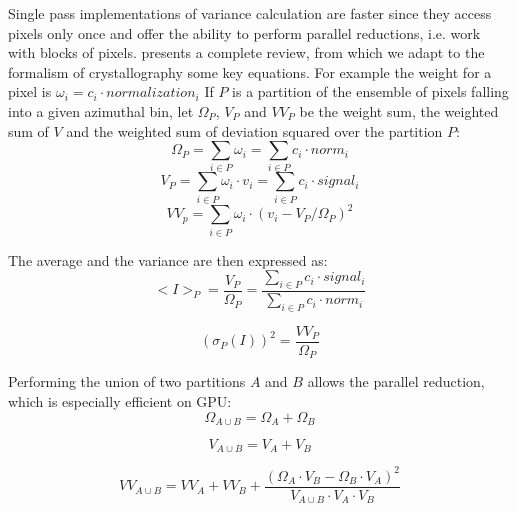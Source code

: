 \documentclass[preprint]{iucr}              %
\begin{document}
 
Single pass implementations of variance calculation are faster since they access pixels only once and offer the ability to perform parallel reductions, i.e. work with blocks of pixels.
 presents a complete review, from which we adapt to the formalism of crystallography some key equations.
For example the weight for a pixel is $\omega_i = c_i \cdot normalization_i$
If $P$ is a partition of the ensemble of pixels falling into a given azimuthal bin, let $\Omega_{P}$, $V_{P}$ and $VV_{P}$  
be the weight sum, the weighted sum of $V$ and the weighted sum of deviation squared over the partition $P$: 
\begin{equation}
\Omega_{P} = \sum\limits_{i \in P} \omega_i = \sum\limits_{i \in P} c_i \cdot norm_i 
\end{equation}
\begin{equation}
V_{P} = \sum\limits_{i \in P} \omega_i \cdot v_i =  \sum\limits_{i \in P} c_i \cdot signal_i
\end{equation}
\begin{equation}
VV_{p} = \sum\limits_{i \in P} \omega_i \cdot (v_i - V_{P}/\Omega_{P})^2 
\end{equation}

The average and the variance are then expressed as:
\begin{equation}
<I>_P = \frac{V_{P}}{\Omega_{P}} =  \frac{\sum\limits_{i \in P} c_i \cdot signal_i}
                        {\sum\limits_{i \in P} c_i \cdot norm_i} 
\end{equation}

\begin{equation}
(\sigma_P(I))^2 = \frac{VV_{P}}{\Omega_{P}}
\end{equation}

Performing the union of two partitions $A$ and $B$ allows the parallel reduction, which is especially efficient on GPU:
\begin{equation}
\Omega_{A \cup B} =  \Omega_{A} + \Omega_{B} 
\end{equation}

\begin{equation}
V_{A \cup B} =  V_{A} + V_{B} 
\end{equation}
  
\begin{equation}
VV_{A \cup B} =  VV_{A} + VV_{B} +  \frac{(\Omega_{A} \cdot V_{B} - \Omega_{B}\cdot V_{A})^2}{V_{A \cup B} \cdot  V_{A} \cdot V_{B}}
\end{equation}
  
\end{document}
